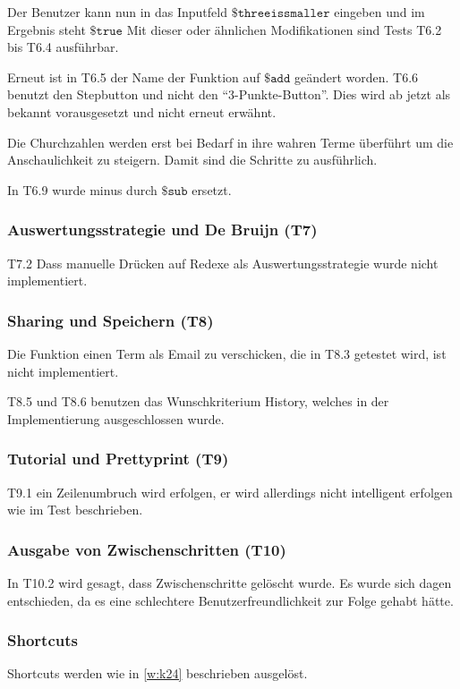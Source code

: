 \documentclass[parskip=full,11pt,twoside]{scrartcl}
\begin{document}
Der Benutzer kann nun in das Inputfeld $\texttt{\$threeissmaller} $ eingeben und 
im Ergebnis steht $\texttt{\$true}$
Mit dieser oder ähnlichen Modifikationen sind Tests T6.2 bis T6.4 ausführbar.


Erneut ist in T6.5 der Name der Funktion auf $\texttt{\$add}$ geändert worden.
T6.6 benutzt den Stepbutton und nicht den \enquote{3-Punkte-Button}.
Dies wird ab jetzt als bekannt vorausgesetzt und nicht erneut erwähnt.

Die Churchzahlen werden erst bei Bedarf in ihre wahren Terme überführt um die
Anschaulichkeit zu steigern. Damit sind die Schritte zu ausführlich.

In T6.9 wurde minus durch $\texttt{\$sub}$ ersetzt. 

\subsubsection{Auswertungsstrategie und De Bruijn (T7)}
T7.2 Dass manuelle Drücken auf Redexe als Auswertungsstrategie wurde nicht implementiert.

\subsubsection{Sharing und Speichern (T8)}

Die Funktion einen Term als Email zu verschicken, die in T8.3 getestet wird,
ist nicht implementiert.

T8.5 und T8.6 benutzen das Wunschkriterium History, welches in der Implementierung
ausgeschlossen wurde.
\subsubsection{Tutorial und Prettyprint (T9)}
T9.1 ein Zeilenumbruch wird erfolgen, er wird allerdings nicht intelligent erfolgen
wie im Test beschrieben.

\subsubsection{Ausgabe von Zwischenschritten (T10)}
In T10.2 wird gesagt, dass Zwischenschritte gelöscht wurde.
Es wurde sich dagen entschieden, da es eine schlechtere Benutzerfreundlichkeit
zur Folge gehabt hätte.

\subsubsection{Shortcuts}
Shortcuts werden wie in \ref{w:k24} beschrieben ausgelöst.
\end{document}

